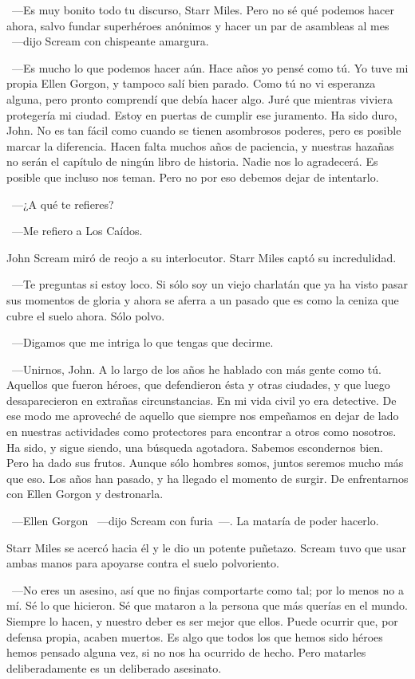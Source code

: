 ~---Es muy bonito todo tu discurso, Starr Miles. Pero no sé qué podemos hacer ahora, salvo fundar superhéroes anónimos y hacer un par de asambleas al mes ~---dijo Scream con chispeante amargura.

~---Es mucho lo que podemos hacer aún. Hace años yo pensé como tú. Yo tuve mi propia Ellen Gorgon, y tampoco salí bien parado. Como tú no vi esperanza alguna, pero pronto comprendí que debía hacer algo. Juré que mientras viviera protegería mi ciudad. Estoy en puertas de cumplir ese juramento. Ha sido duro, John. No es tan fácil como cuando se tienen asombrosos poderes, pero es posible marcar la diferencia. Hacen falta muchos años de paciencia, y nuestras hazañas no serán el capítulo de ningún libro de historia. Nadie nos lo agradecerá. Es posible que incluso nos teman. Pero no por eso debemos dejar de intentarlo.

~---¿A qué te refieres?

~---Me refiero a Los Caídos.

John Scream miró de reojo a su interlocutor. Starr Miles captó su incredulidad.

~---Te preguntas si estoy loco. Si sólo soy un viejo charlatán que ya ha visto pasar sus momentos de gloria y ahora se aferra a un pasado que es como la ceniza que cubre el suelo ahora. Sólo polvo.

~---Digamos que me intriga lo que tengas que decirme.

~---Unirnos, John. A lo largo de los años he hablado con más gente como tú. Aquellos que fueron héroes, que defendieron ésta y otras ciudades, y que luego desaparecieron en extrañas circunstancias. En mi vida civil yo era detective. De ese modo me aproveché de aquello que siempre nos empeñamos en dejar de lado en nuestras actividades como protectores para encontrar a otros como nosotros. Ha sido, y sigue siendo, una búsqueda agotadora. Sabemos escondernos bien. Pero ha dado sus frutos. Aunque sólo hombres somos, juntos seremos mucho más que eso. Los años han pasado, y ha llegado el momento de surgir. De enfrentarnos con Ellen Gorgon y destronarla.

~---Ellen Gorgon ~---dijo Scream con furia~---. La mataría de poder hacerlo.

Starr Miles se acercó hacia él y le dio un potente puñetazo. Scream tuvo que usar ambas manos para apoyarse contra el suelo polvoriento.

~---No eres un asesino, así que no finjas comportarte como tal; por lo menos no a mí. Sé lo que hicieron. Sé que mataron a la persona que más querías en el mundo. Siempre lo hacen, y nuestro deber es ser mejor que ellos. Puede ocurrir que, por defensa propia, acaben muertos. Es algo que todos los que hemos sido héroes hemos pensado alguna vez, si no nos ha ocurrido de hecho. Pero matarles deliberadamente es un deliberado asesinato.

